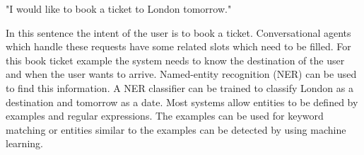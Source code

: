 \begin{center}
"I would like to book a ticket to London tomorrow."
\end{center}

In this sentence the intent of the user is to book a ticket.
Conversational agents which handle these requests have some related slots which need to be filled.
For this book ticket example the system needs to know the destination of the user and when the user wants to arrive.
Named-entity recognition (NER) can be used to find this information.
A NER classifier can be trained to classify London as a destination and tomorrow as a date.
Most systems allow entities to be defined by examples and regular expressions.
The examples can be used for keyword matching or entities similar to the examples can be detected by using machine learning.